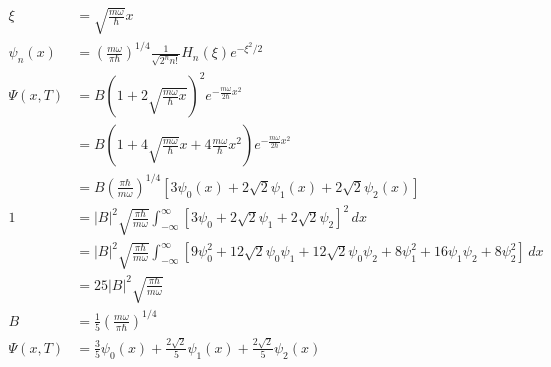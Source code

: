 \documentclass{article}
\begin{document}
\begin{enumerate}
        \begin{align*}
          \xi               & = \sqrt{\frac{m \omega}{\hbar}} x                                                                                                                                                       \\
          \psi_n(x)         & = \left( \frac{m \omega}{\pi \hbar} \right)^{1 / 4} \frac{1}{\sqrt{2^n n!}} H_n(\xi) e^{-\xi^2 / 2}                                                                                     \\
          \Psi(x, T)        & = B \left( 1 + 2 \sqrt{\frac{m \omega}{\hbar} x} \right)^2 e^{-\frac{m \omega}{2 \hbar} x^2}                                                                                            \\
                            & = B \left( 1 + 4 \sqrt{\frac{m \omega}{\hbar}} x + 4 \frac{m \omega}{\hbar} x^2 \right) e^{-\frac{m \omega}{2 \hbar} x^2}                                                               \\
                            & = B \left( \frac{\pi \hbar}{m \omega} \right)^{1 / 4} \left[ 3 \psi_0(x) + 2 \sqrt{2} \psi_1(x) + 2 \sqrt{2} \psi_2(x) \right]                                                          \\
          1                 & = |B|^2 \sqrt{\frac{\pi \hbar}{m \omega}} \int_{-\infty}^\infty  [3 \psi_0 + 2 \sqrt{2} \psi_1 + 2 \sqrt{2} \psi_2]^2 \,d x                                                             \\
                            & = |B|^2 \sqrt{\frac{\pi \hbar}{m \omega}} \int_{-\infty}^\infty [9 \psi_0^2 + 12 \sqrt{2} \psi_0 \psi_1 + 12 \sqrt{2} \psi_0 \psi_2 + 8 \psi_1^2 + 16 \psi_1 \psi_2 + 8 \psi_2^2] \,d x \\
                            & = 25 |B|^2 \sqrt{\frac{\pi \hbar}{m \omega}}                                                                                                                                            \\
          B                 & = \frac{1}{5} \left( \frac{m \omega}{\pi \hbar} \right)^{1 / 4}                                                                                                                         \\
          \Psi(x, T)        & = \frac{3}{5} \psi_0(x) + \frac{2 \sqrt{2}}{5} \psi_1(x) + \frac{2 \sqrt{2}}{5} \psi_2(x)                                                                                               \\

\end{align*}
\end{enumerate}
\end{document}
